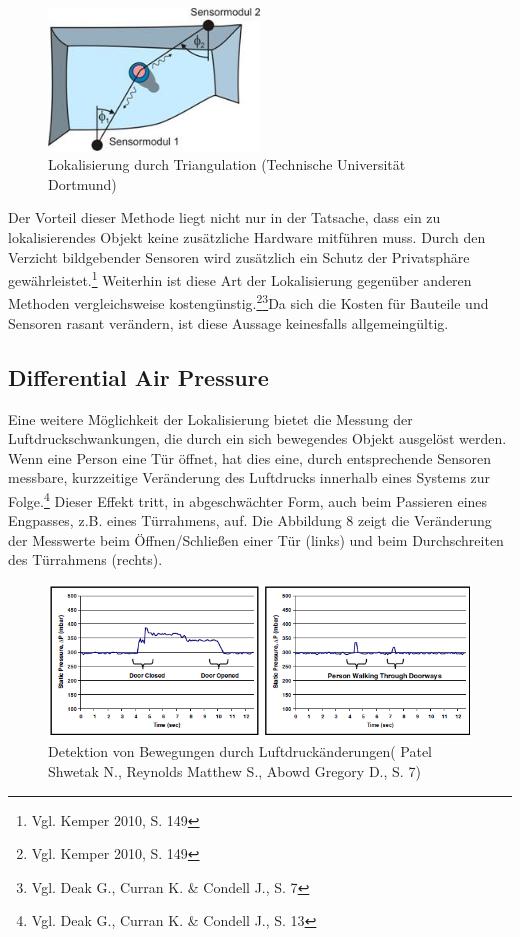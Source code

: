 \begin{figure}[H]
	\centering
	\includegraphics[width=0.5\textwidth]{pictures/triangulation}
	\caption{Lokalisierung durch Triangulation (Technische Universität Dortmund)}
\end{figure}

Der Vorteil dieser Methode liegt nicht nur in der Tatsache, dass ein zu lokalisierendes Objekt keine zusätzliche Hardware mitführen muss. Durch den Verzicht bildgebender Sensoren wird zusätzlich ein Schutz der Privatsphäre gewährleistet.\footnote{Vgl. Kemper 2010, S. 149} Weiterhin ist diese Art der Lokalisierung gegenüber anderen Methoden vergleichsweise kostengünstig.\footnote{Vgl. Kemper 2010, S. 149}\footnote{Vgl. Deak G., Curran K. \& Condell J., S. 7}Da sich die Kosten für Bauteile und Sensoren rasant verändern, ist diese Aussage keinesfalls allgemeingültig. 

\subsection{Differential Air Pressure}
Eine weitere Möglichkeit der Lokalisierung bietet die Messung der Luftdruckschwankungen, die durch ein sich bewegendes Objekt ausgelöst werden. Wenn eine Person eine Tür öffnet, hat dies eine, durch entsprechende Sensoren messbare, kurzzeitige Veränderung des Luftdrucks innerhalb eines Systems zur Folge.\footnote{Vgl. Deak G., Curran K. \& Condell J., S. 13} Dieser Effekt tritt, in abgeschwächter Form, auch beim Passieren eines Engpasses, z.B. eines Türrahmens, auf. Die Abbildung 8 zeigt die Veränderung der Messwerte beim Öffnen/Schließen einer Tür (links) und beim Durchschreiten des Türrahmens (rechts).

\begin{figure}[H]
	\centering
	\includegraphics[width=1.0\textwidth]{pictures/dap_diagramm}
	\caption{Detektion von Bewegungen durch Luftdruckänderungen( Patel Shwetak N., Reynolds Matthew S., Abowd Gregory D., S. 7)}
\end{figure} 

